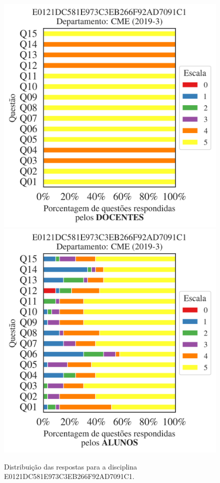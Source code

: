 \documentclass[a4paper,10pt]{article}
\begin{document}
\begin{figure}[h]
\centering
\includegraphics[width=0.485\linewidth]{analise_disciplina_departamento_CME_E0121DC581E973C3EB266F92AD7091C1_docentes.png}
\includegraphics[width=0.485\linewidth]{analise_disciplina_departamento_CME_E0121DC581E973C3EB266F92AD7091C1_alunos.png}
\caption{\label{fig:analise_geral_departamento}                Distribuição das respostas para a disciplina E0121DC581E973C3EB266F92AD7091C1. }
\end{figure}
\end{document}
